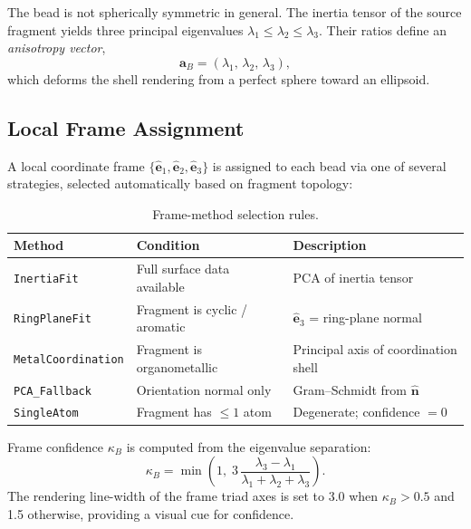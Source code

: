 \documentclass[12pt, a4paper, oneside]{article}
\begin{document}
The bead is not spherically symmetric in general.  The inertia tensor
of the source fragment yields three principal eigenvalues
$\lambda_1 \leq \lambda_2 \leq \lambda_3$.  Their ratios define an
\emph{anisotropy vector},
\begin{equation}
  \bm{a}_B = (\lambda_1, \, \lambda_2, \, \lambda_3),
  \label{eq:aniso}
\end{equation}
which deforms the shell rendering from a perfect sphere toward an
ellipsoid.

\subsection{Local Frame Assignment}

A local coordinate frame $\{\hat{\bm{e}}_1, \hat{\bm{e}}_2,
\hat{\bm{e}}_3\}$ is assigned to each bead via one of several
strategies, selected automatically based on fragment topology:

\begin{table}[htbp]
  \centering
  \caption{Frame-method selection rules.}
  \label{tab:frame_methods}
  \begin{tabular}{lll}
    \toprule
    Method & Condition & Description \\
    \midrule
    \texttt{InertiaFit}        & Full surface data available
      & PCA of inertia tensor \\
    \texttt{RingPlaneFit}      & Fragment is cyclic / aromatic
      & $\hat{\bm{e}}_3$ = ring-plane normal \\
    \texttt{MetalCoordination} & Fragment is organometallic
      & Principal axis of coordination shell \\
    \texttt{PCA\_Fallback}     & Orientation normal only
      & Gram--Schmidt from $\hat{\bm{n}}$ \\
    \texttt{SingleAtom}        & Fragment has $\leq 1$ atom
      & Degenerate; confidence $= 0$ \\
    \bottomrule
  \end{tabular}
\end{table}

Frame confidence $\kappa_B$ is computed from the eigenvalue
separation:
\begin{equation}
  \kappa_B = \min\!\left(1, \;
    3 \, \frac{\lambda_3 - \lambda_1}
              {\lambda_1 + \lambda_2 + \lambda_3}\right).
  \label{eq:frame_confidence}
\end{equation}
The rendering line-width of the frame triad axes is set to 3.0 when
$\kappa_B > 0.5$ and 1.5 otherwise, providing a visual cue for
confidence.
\end{document}
